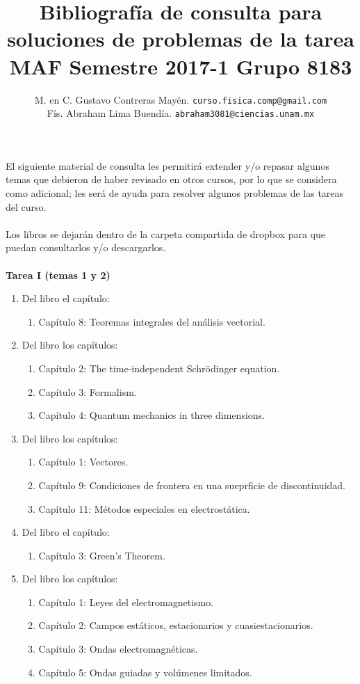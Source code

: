 \documentclass[12pt]{article}
\author{M. en C. Gustavo Contreras Mayén. \texttt{curso.fisica.comp@gmail.com}\\
Fís. Abraham Lima Buendía. \texttt{abraham3081@ciencias.unam.mx}}
\title{Bibliografía de consulta para soluciones de problemas de la tarea \\ {\large MAF Semestre 2017-1 Grupo 8183}}
\date{ }
\begin{document}
\vspace{-4cm}
\renewcommand\labelenumii{\theenumi.{\arabic{enumii}}}
\maketitle
\fontsize{14}{14}\selectfont

El siguiente material de consulta les permitirá extender y/o repasar algunos temas que debieron de haber revisado en otros cursos, por lo que se considera como adicional; les será de ayuda para resolver algunos problemas de las tareas del curso.
\\
\\
Los libros se dejarán dentro de la carpeta compartida de dropbox para que puedan consultarlos y/o descargarlos.
\\
\\
\textbf{Tarea I (temas 1 y 2)} 
\\
\begin{enumerate}
\item Del libro \cite{Marsden_1991} el capítulo:
\begin{enumerate}
\item Capítulo 8: Teoremas integrales del análisis vectorial.
\end{enumerate}
\item Del libro \cite{Griffits_1995} los capítulos:
\begin{enumerate}
\item Capítulo 2: The time-independent Schrödinger equation.
\item Capítulo 3: Formalism.
\item Capítulo 4: Quantum mechanics in three dimensions.
\end{enumerate}
\item Del libro \cite{Wangsness_2001} los capítulos:
\begin{enumerate}
\item Capítulo 1: Vectores.
\item Capítulo 9: Condiciones de frontera en una sueprficie de discontinuidad.
\item Capítulo 11: Métodos especiales en electrostática.
\end{enumerate}
\item Del libro \cite{Greiner_electro} el capítulo:
\begin{enumerate}
\item Capítulo 3: Green's Theorem.
\end{enumerate}
\item Del libro \cite{Nikolski} los capítulos:
\begin{enumerate}
\item Capítulo 1: Leyes del electromagnetismo. 
\item Capítulo 2: Campos estáticos, estacionarios y cuasiestacionarios.
\item Capítulo 3: Ondas electromagnéticas.
\item Capítulo 5: Ondas guiadas y volúmenes limitados.
\end{enumerate}
\end{enumerate}


\end{document}
